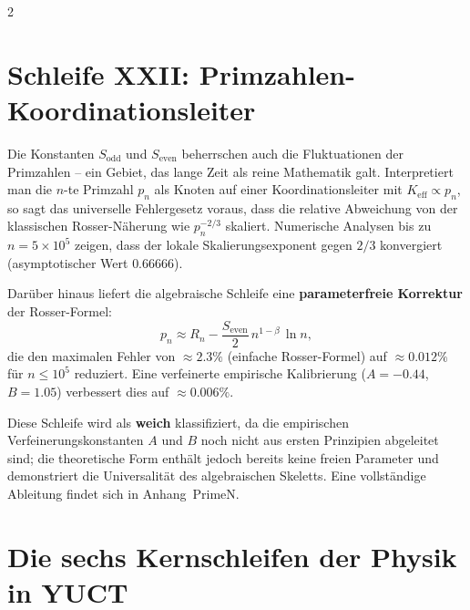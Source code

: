 \documentclass[12pt,a4paper]{article}
\begin{document}
\begin{multicols}{2}
		\section{Schleife XXII: Primzahlen-Koordinationsleiter}
		
		Die Konstanten \(S_{\mathrm{odd}}\) und \(S_{\mathrm{even}}\) beherrschen auch die Fluktuationen der Primzahlen – ein Gebiet, das lange Zeit als reine Mathematik galt. Interpretiert man die \(n\)-te Primzahl \(p_n\) als Knoten auf einer Koordinationsleiter mit \(K_{\mathrm{eff}} \propto p_n\), so sagt das universelle Fehlergesetz voraus, dass die relative Abweichung von der klassischen Rosser-Näherung wie \(p_n^{-2/3}\) skaliert. Numerische Analysen bis zu \(n = 5\times10^5\) zeigen, dass der lokale Skalierungsexponent gegen \(2/3\) konvergiert (asymptotischer Wert \(0.66666\)).
		
		Darüber hinaus liefert die algebraische Schleife eine \textbf{parameterfreie Korrektur} der Rosser-Formel:
		\[
		p_n \approx R_n - \frac{S_{\mathrm{even}}}{2}\, n^{1-\beta}\,\ln n,
		\]
		die den maximalen Fehler von \(\approx 2.3\%\) (einfache Rosser-Formel) auf \(\approx 0.012\%\) für \(n\le 10^5\) reduziert. Eine verfeinerte empirische Kalibrierung (\(A = -0.44\), \(B = 1.05\)) verbessert dies auf \(\approx 0.006\%\).
		
		Diese Schleife wird als \textbf{weich} klassifiziert, da die empirischen Verfeinerungskonstanten \(A\) und \(B\) noch nicht aus ersten Prinzipien abgeleitet sind; die theoretische Form enthält jedoch bereits keine freien Parameter und demonstriert die Universalität des algebraischen Skeletts. Eine vollständige Ableitung findet sich in Anhang~PrimeN.
		
	\end{multicols}
	
	\section*{Die sechs Kernschleifen der Physik in YUCT}
	
\end{document}
